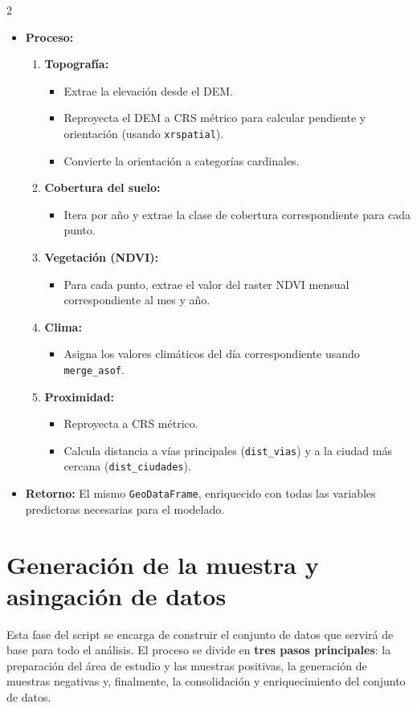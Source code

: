 \documentclass[a4paper,10pt]{article}
\begin{document}
\begin{multicols}{2}
\begin{itemize}
    \item \textbf{Proceso:}
    \begin{enumerate}
        \item \textbf{Topografía:}
        \begin{itemize}
            \item Extrae la elevación desde el DEM.
            \item Reproyecta el DEM a CRS métrico para calcular pendiente y orientación (usando \texttt{xrspatial}).
            \item Convierte la orientación a categorías cardinales.
        \end{itemize}
        \item \textbf{Cobertura del suelo:}
        \begin{itemize}
            \item Itera por año y extrae la clase de cobertura correspondiente para cada punto.
        \end{itemize}
        \item \textbf{Vegetación (NDVI):}
        \begin{itemize}
            \item Para cada punto, extrae el valor del raster NDVI mensual correspondiente al mes y año.
        \end{itemize}
        \item \textbf{Clima:}
        \begin{itemize}
            \item Asigna los valores climáticos del día correspondiente usando \texttt{merge\_asof}.
        \end{itemize}
        \item \textbf{Proximidad:}
        \begin{itemize}
            \item Reproyecta a CRS métrico.
            \item Calcula distancia a vías principales (\texttt{dist\_vias}) y a la ciudad más cercana (\texttt{dist\_ciudades}).
        \end{itemize}
    \end{enumerate}

    \item \textbf{Retorno:} El mismo \texttt{GeoDataFrame}, enriquecido con todas las variables predictoras necesarias para el modelado.
\end{itemize}
\section{Generación de la muestra y asingación de datos}
 Esta fase del script se encarga de construir el conjunto de datos que servirá de base para todo el análisis. El proceso se divide en \textbf{tres pasos principales}: la preparación del área de estudio y las muestras positivas, la generación de muestras negativas y, finalmente, la consolidación y enriquecimiento del conjunto de datos.

\end{multicols}
\end{document}
